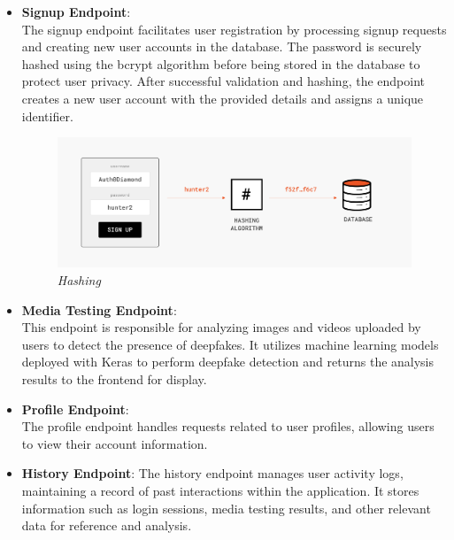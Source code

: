 \begin{itemize}
\begin{itemize}
              \item \textbf{Signup Endpoint}:\\
                    The signup endpoint facilitates user registration by processing signup requests and creating new user accounts in the database. The password is securely hashed using the bcrypt algorithm before being stored in the database to protect user privacy. After successful validation and hashing, the endpoint creates a new user account with the provided details and assigns a unique identifier.

                    \begin{figure}[htbp]
                        \centering
                        \includegraphics[width=5in]{img/example-of-hashing-during-signup.png}
                        \caption{\textit{Hashing}}
                    \end{figure}
                    \newpage
              \item \textbf{Media Testing Endpoint}:\\
                    This endpoint is responsible for analyzing images and videos uploaded by users to detect the presence of deepfakes. It utilizes machine learning models deployed with Keras to perform deepfake detection and returns the analysis results to the frontend for display.

              \item \textbf{Profile Endpoint}:\\
                    The profile endpoint handles requests related to user profiles, allowing users to view their account information.

              \item \textbf{History Endpoint}: The history endpoint manages user activity logs, maintaining a record of past interactions within the application. It stores information such as login sessions, media testing results, and other relevant data for reference and analysis.
          \end{itemize}


\end{itemize}
